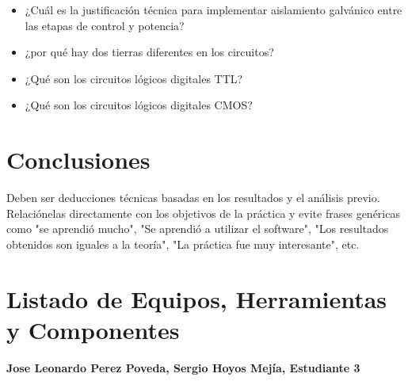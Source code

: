 \documentclass[12pt]{article}
\newcommand{\estudiantes}{Jose Leonardo Perez Poveda, Sergio Hoyos Mejía, Estudiante 3}
\begin{document}
\begin{itemize}
    \item ¿Cuál es la justificación técnica para implementar aislamiento galvánico entre las etapas de control y potencia?
    \item ¿por qué hay dos tierras diferentes en los circuitos?
    \item ¿Qué son los circuitos lógicos digitales TTL?
    \item ¿Qué son los circuitos lógicos digitales CMOS?
\end{itemize}


\section{Conclusiones}
Deben ser deducciones técnicas basadas en los resultados y el análisis previo. Relaciónelas directamente con los objetivos de la práctica y evite frases genéricas como "se aprendió mucho", "Se aprendió a utilizar el software", "Los resultados obtenidos son iguales a la teoría", "La práctica fue muy interesante", etc.




\newpage

\section*{Listado de Equipos, Herramientas y Componentes}

{\textbf{\estudiantes}}
\end{document}
